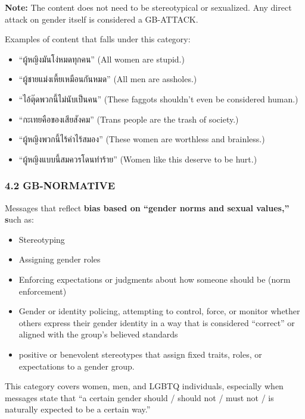\documentclass[12pt,oneside,openright,a4paper]{cpe-english-project}
\begin{document}
\textbf{Note:} The content does not need to be stereotypical or
sexualized. Any direct attack on gender itself is considered a
GB-ATTACK.

Examples of content that falls under this category:

\begin{itemize}
\setlength{\itemsep}{0.15\baselineskip}
\setlength{\parsep}{0pt}
\setlength{\parskip}{0pt}
\item
  ``ผู้หญิงมันโง่หมดทุกคน'' (All women are stupid.)
\item
  ``ผู้ชายแม่งเหี้ยเหมือนกันหมด'' (All men are assholes.)
\item
  ``ไอ้ตุ๊ดพวกนี้ไม่นับเป็นคน'' (These faggots shouldn't even be considered
  human.)
\item
  ``กะเทยคือของเสียสังคม'' (Trans people are the trash of society.)
\item
  ``ผู้หญิงพวกนี้ไร้ค่าไร้สมอง'' (These women are worthless and brainless.)
\item
  ``ผู้หญิงแบบนี้สมควรโดนทำร้าย'' (Women like this deserve to be hurt.)
\end{itemize}

\subsubsection{4.2 GB-NORMATIVE}\label{gb-normative}

Messages that reflect \textbf{bias based on ``gender norms and sexual
values,'' s}uch as:

\begin{itemize}
\setlength{\itemsep}{0.15\baselineskip}
\setlength{\parsep}{0pt}
\setlength{\parskip}{0pt}
\item
  Stereotyping
\item
  Assigning gender roles
\item
  Enforcing expectations or judgments about how someone should be (norm
  enforcement)
\item
  Gender or identity policing, attempting to control, force, or monitor
  whether others express their gender identity in a way that is
  considered ``correct'' or aligned with the group's believed
  standards
\item
  positive or benevolent stereotypes that assign fixed traits, roles, or
  expectations to a gender group.
\end{itemize}

This category covers women, men, and LGBTQ individuals, especially when
messages state that ``a certain gender should / should not / must not /
is naturally expected to be a certain way.''
\end{document}
